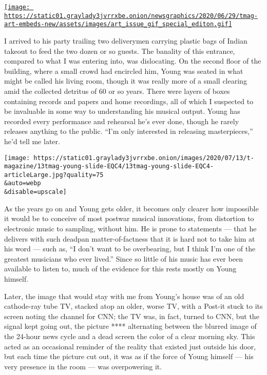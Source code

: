 \href{https://www.nytimes3xbfgragh.onion/issue/t-magazine/2020/07/02/true-believers-art-issue}{\texttt{[image: https://static01.graylady3jvrrxbe.onion/newsgraphics/2020/06/29/tmag-art-embeds-new/assets/images/art\_issue\_gif\_special\_editon.gif]}}

I arrived to his party trailing two deliverymen carrying plastic bags of
Indian takeout to feed the two dozen or so guests. The banality of this
entrance, compared to what I was entering into, was dislocating. On the
second floor of the building, where a small crowd had encircled him,
Young was seated in what might be called his living room, though it was
really more of a small clearing amid the collected detritus of 60 or so
years. There were layers of boxes containing records and papers and home
recordings, all of which I suspected to be invaluable in some way to
understanding his musical output. Young has recorded every performance
and rehearsal he's ever done, though he rarely releases anything to the
public. ``I'm only interested in releasing masterpieces,'' he'd tell me
later.

\texttt{[image: https://static01.graylady3jvrrxbe.onion/images/2020/07/13/t-magazine/13tmag-young-slide-EQC4/13tmag-young-slide-EQC4-articleLarge.jpg?quality=75\\\&auto=webp\\\&disable=upscale]}

As the years go on and Young gets older, it becomes only clearer how
impossible it would be to conceive of most postwar musical innovations,
from distortion to electronic music to sampling, without him. He is
prone to statements --- that he delivers with such deadpan
matter-of-factness that it is hard not to take him at his word --- such
as, ``I don't want to be overbearing, but I think I'm one of the
greatest musicians who ever lived.'' Since so little of his music has
ever been available to listen to, much of the evidence for this rests
mostly on Young himself.

Later, the image that would stay with me from Young's house was of an
old cathode-ray tube TV, stacked atop an older, worse TV, with a Post-it
stuck to its screen noting the channel for CNN; the TV was, in fact,
turned to CNN, but the signal kept going out, the picture ****
alternating between the blurred image of the 24-hour news cycle and a
dead screen the color of a clear morning sky. This acted as an
occasional reminder of the reality that existed just outside his door,
but each time the picture cut out, it was as if the force of Young
himself --- his very presence in the room --- was overpowering it.

